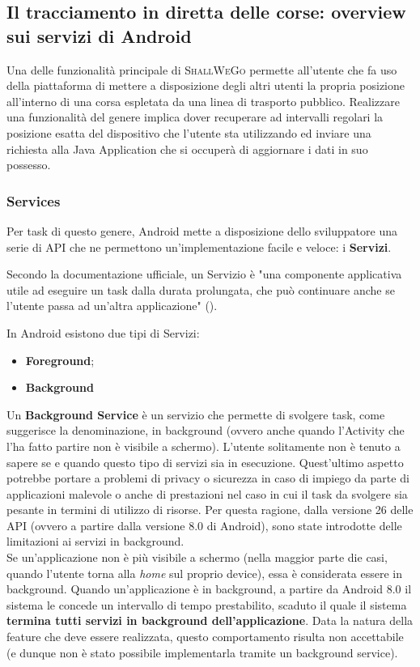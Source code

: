         \subsection{Il tracciamento in diretta delle corse: overview sui servizi di Android}
            Una delle funzionalità principale di \textsc{ShallWeGo} permette all'utente che fa uso della piattaforma di mettere a disposizione degli altri utenti la propria posizione all'interno di una corsa espletata da una linea di trasporto pubblico.
            Realizzare una funzionalità del genere implica dover recuperare ad intervalli regolari la posizione esatta del dispositivo che l'utente sta utilizzando ed inviare una richiesta alla Java Application che si occuperà di aggiornare i dati in suo possesso.
            
            \subsubsection{Services}
                Per task di questo genere, Android mette a disposizione dello sviluppatore una serie di API che ne permettono un'implementazione facile e veloce: i \textbf{Servizi}.

                Secondo la documentazione ufficiale, un Servizio è "una componente applicativa utile ad eseguire un task dalla durata prolungata, che può continuare anche se l'utente passa ad un'altra applicazione" (\cite{AndroidDocService}).

                In Android esistono due tipi di Servizi: 

                \begin{itemize}
                    \item \textbf{Foreground};
                    \item \textbf{Background} 
                \end{itemize}

                Un \textbf{Background Service} è un servizio che permette di svolgere task, come suggerisce la denominazione, in background (ovvero anche quando l'Activity che l'ha fatto partire non è visibile a schermo). L'utente solitamente non è tenuto a sapere se e quando questo tipo di servizi sia in esecuzione. Quest'ultimo aspetto potrebbe portare a problemi di privacy o sicurezza in caso di impiego da parte di applicazioni malevole o anche di prestazioni nel caso in cui il task da svolgere sia pesante in termini di utilizzo di risorse. Per questa ragione, dalla versione 26 delle API (ovvero a partire dalla versione 8.0 di Android), sono state introdotte delle limitazioni ai servizi in background. \\
                Se un'applicazione non è più visibile a schermo (nella maggior parte die casi, quando l'utente torna alla \textit{home} sul proprio device), essa è considerata essere in background. Quando un'applicazione è in background, a partire da Android 8.0 il sistema le concede un intervallo di tempo prestabilito, scaduto il quale il sistema \textbf{termina tutti servizi in background dell'applicazione}. Data la natura della feature che deve essere realizzata, questo comportamento risulta non accettabile (e dunque non è stato possibile implementarla tramite un background service).
                
